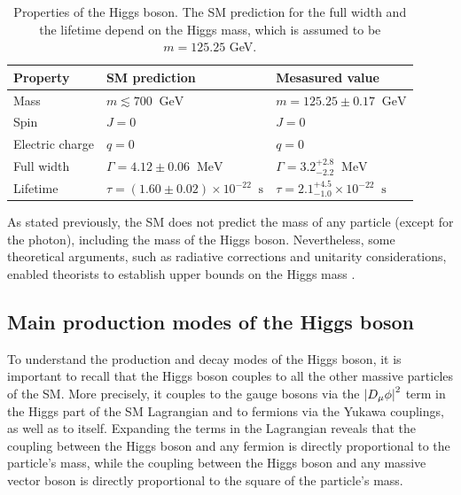 \begin{table}[ht]
    \centering
    \begin{tabular}{|l|l|l|}
        \hline
        \cellcolor{lightgray}Property & \cellcolor{lightgray}SM prediction & \cellcolor{lightgray}Mesasured value \\ \hline
        Mass                & $m \lesssim 700 \;\; \text{GeV}$ & $m = 125.25 \pm 0.17 \;\; \text{GeV}$             \\
        Spin                &  $J=0$ & $J=0$                                             \\
        Electric charge     & $q=0$  & $q=0$                                             \\
        Full width          & $\Gamma = 4.12 \pm 0.06 \;\;  \text{MeV}$  & $\Gamma = 3.2^{+2.8}_{-2.2} \;\;  \text{MeV}$     \\
        Lifetime            & $\tau = (1.60 \pm 0.02) \times 10^{-22} \;\;  \text{s}$  & $\tau = 2.1^{+4.5}_{-1.0} \times 10^{-22} \;\;  \text{s}$   \\ \hline
    \end{tabular}
    \caption{Properties of the Higgs boson. The SM prediction for the full width and the lifetime depend on the Higgs mass, which is assumed to be $m = 125.25$ GeV.}
    \label{tab:higgs_properties}
\end{table}

As stated previously, the SM does not predict the mass of any particle (except for the photon), including the mass of the Higgs boson. Nevertheless, some theoretical arguments, such as radiative corrections and unitarity considerations, enabled theorists to establish upper bounds on the Higgs mass \cite{Djouadi:2005gi}.

\subsection{Main production modes of the Higgs boson}\label{subsec:higgs_production}

To understand the production and decay modes of the Higgs boson, it is important to recall that the Higgs boson couples to all the other massive particles of the SM. More precisely, it couples to the gauge bosons via the $\left\lvert D_{\mu}\phi\right\rvert^2$ term in the Higgs part of the SM Lagrangian and to fermions via the Yukawa couplings, as well as to itself. Expanding the terms in the Lagrangian reveals that the coupling between the Higgs boson and any fermion is directly proportional to the particle's mass, while the coupling between the Higgs boson and any massive vector boson is directly proportional to the square of the particle's mass.

